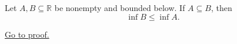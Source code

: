 \begin{theorem}
\label{thm:infimum-is-monotone-under-inclusion}
Let $A,B\subseteq\mathbb{R}$ be nonempty and bounded below. If
$A\subseteq B$, then
\[
  \inf B\leq\inf A.
\]

\hyperref[prf:infimum-is-monotone-under-inclusion]{Go to proof.}
\end{theorem}